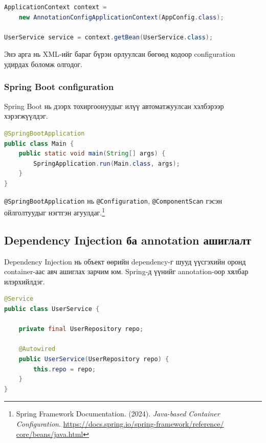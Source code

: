 \begin{lstlisting}[language=Java, frame=single, caption={Java configuration-оос container үүсгэх жишээ}, label={lst:java-context-example}]
ApplicationContext context =
    new AnnotationConfigApplicationContext(AppConfig.class);

UserService service = context.getBean(UserService.class);
\end{lstlisting}

Энэ арга нь XML-ийг бараг бүрэн орлуулсан бөгөөд кодоор configuration удирдах боломж олгодог.

\subsubsection{Spring Boot configuration}

Spring Boot нь дээрх тохиргоонуудыг илүү автоматжуулсан хэлбэрээр хэрэгжүүлдэг.

\begin{lstlisting}[language=Java, frame=single, caption={Spring Boot configuration жишээ}, label={lst:springboot-config-example}]
@SpringBootApplication
public class Main {
    public static void main(String[] args) {
        SpringApplication.run(Main.class, args);
    }
}
\end{lstlisting}

\texttt{@SpringBootApplication} нь \texttt{@Configuration}, \texttt{@ComponentScan} гэсэн ойлголтуудыг нэгтгэн агуулдаг.\footnote{Spring Framework
Documentation. (2024).
\textit{Java-based Container Configuration}.
\url{https://docs.spring.io/spring-framework/reference/
core/beans/java.html}}

\subsection{Dependency Injection ба annotation ашиглалт}

Dependency Injection нь объект өөрийн dependency-г шууд үүсгэхийн оронд container-аас авч ашиглах зарчим юм. Spring-д үүнийг annotation-оор хялбар илэрхийлдэг.

\begin{lstlisting}[language=Java, frame=single, caption={Autowired ашигласан dependency injection жишээ}, label={lst:autowired-example}]
@Service
public class UserService {

    private final UserRepository repo;

    @Autowired
    public UserService(UserRepository repo) {
        this.repo = repo;
    }
}
\end{lstlisting}

